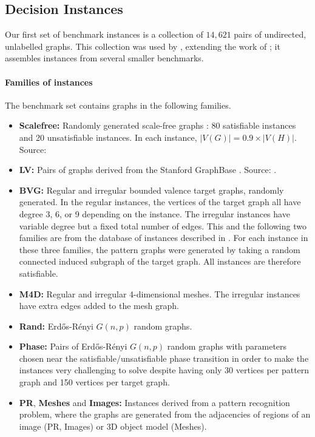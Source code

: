 \subsection{Decision Instances}\label{subsec:si-decision-experiment}

Our first set of benchmark instances is
a collection of $14,621$ pairs of undirected, unlabelled graphs.
This collection was used by \citet{DBLP:conf/cpaior/ArchibaldDHMP019},
extending the work of \citet{DBLP:conf/lion/KotthoffMS16};
it assembles instances from several smaller benchmarks.

\paragraph*{Families of instances} The benchmark set contains graphs
in the following families.

\begin{itemize}
    \item
        \textbf{Scalefree:} Randomly generated scale-free graphs \citep{DBLP:books/daglib/0012457}: 80
        satisfiable instances and 20 unsatisfiable instances.  In each instance,
        $|V(G)| = 0.9 \times |V(H)|$. Source: \citet{DBLP:journals/constraints/ZampelliDS10}
    \item
        \textbf{LV:} Pairs of graphs derived from the Stanford GraphBase \citep{DBLP:books/daglib/0071477}.
        Source: \cite{DBLP:journals/mscs/LarrosaV02}.
    \item \textbf{BVG:} Regular and irregular bounded valence target graphs, randomly generated.
        In the regular instances, the vertices of the target graph all have degree 3, 6, or 9
        depending on the instance.  The irregular instances have variable degree but a fixed total
        number of edges.
        This and the following two families are from the database
        of instances described in \citet{DBLP:journals/prl/SantoFSV03}.  For each instance in these
        three families, the pattern graphs were generated by taking a random connected
        induced subgraph of the target graph. All instances are therefore satisfiable.
    \item \textbf{M4D:} Regular and irregular 4-dimensional meshes.  The irregular instances have
        extra edges added to the mesh graph.
    \item \textbf{Rand:} Erd\H{o}s-Rényi $G(n,p)$ random graphs.
    \item \textbf{Phase:} Pairs of Erd\H{o}s-Rényi $G(n,p)$ random graphs
        with parameters chosen near the satisfiable/unsatisfiable phase transition in order
        to make the instances very challenging to solve despite having only 30 vertices
        per pattern graph and 150 vertices per target graph.
        \citep{DBLP:journals/jair/McCreeshPST18}
    \item \textbf{PR}, \textbf{Meshes} and \textbf{Images:} Instances derived from a pattern recognition problem, where
    	the graphs are generated from the adjacencies of regions of an image (PR, Images)
	or 3D object model (Meshes). \citep{DBLP:journals/pr/SolnonDHJ15,DBLP:journals/cviu/DamiandSHJS11}
\end{itemize}


